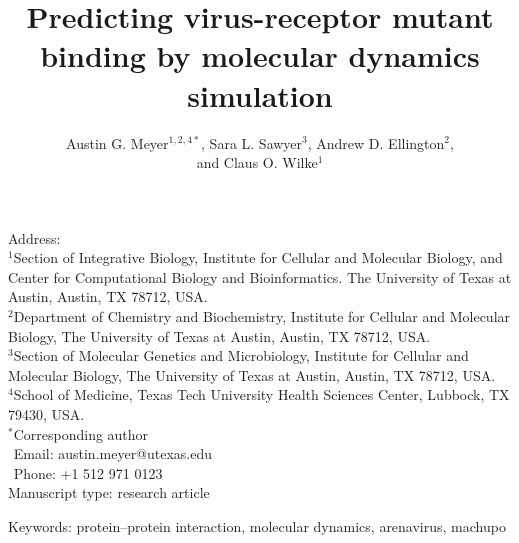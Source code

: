 \documentclass[12pt]{article}
\begin{document}
\title{\textbf{Predicting virus-receptor mutant binding by molecular dynamics simulation}}
\author{Austin G. Meyer$^{1,2,4*}$, Sara L. Sawyer$^{3}$, Andrew D. Ellington$^{2}$,\\and Claus O. Wilke$^{1}$}
\date{}

\maketitle
\noindent
Address:\\
$^1$Section of Integrative Biology, Institute for Cellular and Molecular
Biology, and Center for Computational Biology and Bioinformatics. The University
of Texas at Austin, Austin, TX 78712, USA.\\
$^2$Department of Chemistry and Biochemistry, Institute for Cellular and Molecular 
Biology, The University of Texas at Austin, Austin, TX 78712, USA.\\
$^3$Section of Molecular Genetics and Microbiology, Institute for Cellular and Molecular 
Biology, The University of Texas at Austin, Austin, TX 78712, USA.\\
$^4$School of Medicine, Texas Tech University Health Sciences Center, 
Lubbock, TX 79430, USA.\\

\bigskip
\noindent
$^*$Corresponding author\\
$\phantom{^*}$Email: austin.meyer@utexas.edu\\
$\phantom{^*}$Phone: +1 512 971 0123\\

\bigskip
\noindent
Manuscript type: research article

\bigskip
\noindent Keywords: protein--protein interaction, molecular dynamics, arenavirus, machupo
\end{document}
